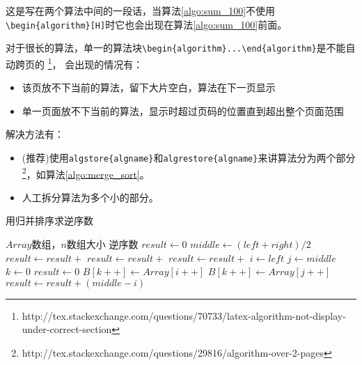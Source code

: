 这是写在两个算法中间的一段话，当算法\ref{algo:sum_100}不使用\verb+\begin{algorithm}[H]+时它也会出现在算法\ref{algo:sum_100}前面。

对于很长的算法，单一的算法块\verb+\begin{algorithm}...\end{algorithm}+是不能自动跨页的
\footnote{http://tex.stackexchange.com/questions/70733/latex-algorithm-not-display-under-correct-section}，
会出现的情况有：

\begin{itemize}
  \item 该页放不下当前的算法，留下大片空白，算法在下一页显示
  \item 单一页面放不下当前的算法，显示时超过页码的位置直到超出整个页面范围
\end{itemize}

解决方法有：

\begin{itemize}
  \item (推荐)使用\verb+algstore{algname}+和\verb+algrestore{algname}+来讲算法分为两个部分\footnote{http://tex.stackexchange.com/questions/29816/algorithm-over-2-pages}，如算法\ref{algo:merge_sort}。
  \item 人工拆分算法为多个小的部分。
\end{itemize}

\begin{algorithm}
\caption{用归并排序求逆序数}
\label{algo:merge_sort}
\begin{algorithmic}[1] %
\Require $Array$数组，$n$数组大小 %
\Ensure 逆序数 %
  \State $result \gets 0$
    \State $middle \gets (left + right) / 2$
    \State $result \gets result +$ 
    \State $result \gets result +$ 
    \State $result \gets result +$ 
  \EndIf
  \State {}
\EndFunction
\State %
  \State $i\gets left$
  \State $j\gets middle$
  \State $k\gets 0$
  \State $result \gets 0$
      \State $B[k++]\gets Array[i++]$
    \Else
      \State $B[k++] \gets Array[j++]$
      \State $result \gets result + (middle - i)$
    \EndIf
  \EndWhile
\end{algorithmic}
\end{algorithm}

